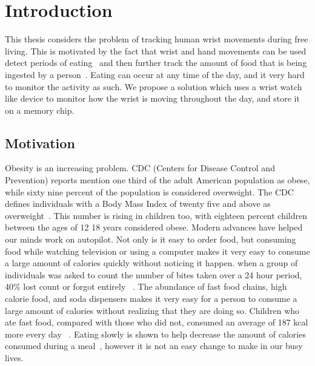 
\chapter{Introduction}
This thesis considers the problem of tracking human wrist movements during free living. This is motivated by the fact that wrist and hand movements can be used detect periods of eating~\cite{dong2013detecting} and then further track the amount of food that is being ingested by a person~\cite{dong2012new}. Eating can occur at any time of the day, and it very hard to monitor the activity as such. We propose a solution which uses a wrist watch like device to monitor how the wrist is moving throughout the day, and store it on a memory chip.
\section{Motivation}
\label{Sec:Motivation}

 Obesity is an increasing problem. CDC (Centers for Disease Control and Prevention) reports mention one
 \textemdash{} third of the adult American population as 
 obese, while sixty nine percent of the population is considered 
 overweight. The CDC defines individuals with a Body Mass
 Index of twenty five and above as overweight~\cite{ogden2010prevalence}.
 This number is rising in children too, with eighteen
 percent children between the ages of 12 \textemdash{} 18
 years considered obese. Modern advances have helped our minds work
 on autopilot. Not only is it easy to order food, but consuming
 food while watching television or using a computer makes
 it very easy to consume a large amount of calories quickly without
 noticing it happen. when a group
 of individuals was asked to count the number of bites taken over
 a 24 hour period, 40\% lost count or forgot entirely ~\cite{mahoney1975obese}.
 The abundance of fast food chains, high calorie food, and soda dispensers makes it very easy
 for a person to consume a large amount of calories without realizing 
 that they are doing so. Children who ate fast food, compared with those who did not,
 consumed an average of 187 kcal more every day ~\cite{bowman2004effects}.
 Eating slowly is shown to help decrease the amount of calories
 consumed during a meal~\cite{Andrade2008}, however it is not an
 easy change to make in our busy lives.

